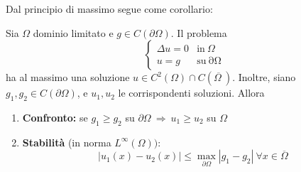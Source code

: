 \documentclass[10pt,a4paper,twoside,openright]{book}
\begin{document}
Dal principio di massimo segue come corollario:
\begin{theorem}
	Sia $\displaystyle \Omega $ dominio limitato e $\displaystyle g\in C( \partial \Omega)$. Il problema 
	\begin{equation*}
		\begin{cases}
			\Delta u=0 & \text{in} \ \Omega                   \\
			u=g        & \text{su}\mathrm{\ \partial \Omega } 
		\end{cases}
	\end{equation*}
	ha al massimo una soluzione $\displaystyle u\in C^{2}(\Omega) \cap C(\overline{\Omega \ })$. Inoltre, siano $\displaystyle g_{1},g_{2} \in C( \partial \Omega)$, e $\displaystyle u_{1},u_{2}$ le corrispondenti soluzioni. Allora
	\begin{enumerate}
		\item \textbf{Confronto: }se $\displaystyle g_{1} \geqslant g_{2}$ su $\displaystyle \partial \Omega \ \Rightarrow \ u_{1} \geqslant u_{2}$ su $\displaystyle \Omega $
		\item \textbf{Stabilità }(in norma $\displaystyle L^{\infty }(\Omega)) :$ 
		      \begin{equation}
		      	| u_{1}(x) -u_{2}(x)| \leqslant \max_{\partial \Omega }| g_{1} -g_{2}| \ \forall x\in \overline{\Omega }
		      	\label{eq:lap-stabilita}
		      \end{equation}
	\end{enumerate}
\end{theorem}
\end{document}
